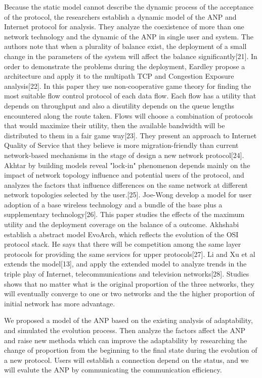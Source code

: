 \documentclass{article}
\begin{document}
Because the static model cannot describe the dynamic process of the acceptance of the protocol, the researchers establish
a dynamic model of the ANP and Internet protocol for analysis. They analyze the coexistence of more than one network
technology and the dynamic of the ANP in single user and system. The authors note that when a plurality of balance
exist, the deployment of a small change in the parameters of the system will affect the balance significantly[21].
In order to demonstrate the problems during the deployment, Eardley propose a architecture and apply it to the multipath
TCP and Congestion Exposure analysis[22]. In this paper they use non-cooperative game theory for finding the most
suitable flow control protocol of each data flow. Each flow has a utility that depends on throughput and also a
disutility depends on the queue lengths encountered along the route taken. Flows will choose a combination of protocols
that would maximize their utility, then the available bandwidth will be distributed to them in a fair game way[23].
They present an approach to Internet Quality of Service that they believe is more migration-friendly than current
network-based mechanisms in the stage of design a new network protocol[24]. Akhtar by building models reveal "lock-in"
phenomenon depends mainly on the impact of network topology influence and potential users of the protocol, and analyzes
the factors that influence differences on the same network at different network topologies selected by the user.[25].
Joe-Wong develop a model for user adoption of a base wireless technology and a bundle of the base plus a supplementary
technology[26]. This paper studies the effects of the maximum utility and the deployment coverage on the balance of a
outcome. Akhshabi establish a abstract model EvoArch, which reflects the evolution of the OSI protocol stack. He says
that there will be competition among the same layer protocols for providing the same services for upper protocols[27].
Li and Xu et al extends the model[13], and apply the extended model to analyze trends in the triple play of Internet,
telecommunications and television networks[28]. Studies shows that no matter what is the original proportion of the
three networks, they will eventually converge to one or two networks and the the higher proportion of initial network
has more advantage.

We proposed a model of the ANP based on the existing analysis of adaptability, and simulated the evolution process.
Then analyze the factors affect the ANP and raise new methoda which can improve the adaptability by researching
the change of proportion from the beginning to the final state during the evolution of a new protocol. Users will
establish a connection depend on the status, and we will evalute the ANP by communicating the communication efficiency.
\end{document}
